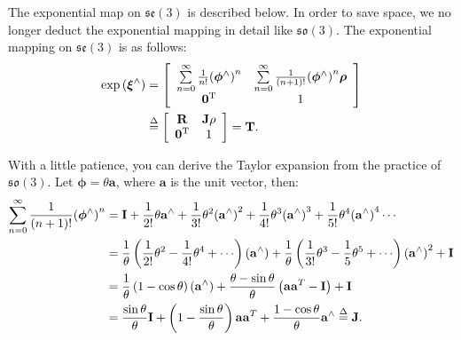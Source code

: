 The exponential map on $\mathfrak{se}(3)$ is described below. In order to save space, we no longer deduct the exponential mapping in detail like $\mathfrak{so}(3)$. The exponential mapping on $\mathfrak{se}(3)$ is as follows:
\begin{align}
\exp \left( {{ \boldsymbol{\xi} ^ \wedge }} \right) &= \left[ {\begin{array}{*{20}{c}}
    {\sum\limits_{n = 0}^\infty {\frac{1}{{n!}}{{\left( {{\boldsymbol{\phi} ^ \wedge }} \right)}^n} } }&{\sum\limits_{n = 0}^\infty {\frac{1}{{\left( {n + 1} \right)!}}{{\left( {{\boldsymbol{\phi } ^ \wedge }} \right)}^n} \boldsymbol{\rho} } }\\
    {{\mathbf{0}^\mathrm{T}}}&1
    \end{array}} \right] \\
&\buildrel \Delta \over = \left[ {\begin{array}{*{20}{c}}
    \mathbf{R} &{\mathbf{J\rho} } \\
    {{\mathbf{0}^\mathrm{T}}}&1
    \end{array}} \right] = \mathbf{T}.
\end{align}

With a little patience, you can derive the Taylor expansion from the practice of $\mathfrak{so}(3)$. Let $\boldsymbol{\phi}=\theta \mathbf{a}$, where $\mathbf{a}$ is the unit vector, then:
\begin{equation}
\begin{aligned}
\sum\limits_{n = 0}^\infty {\frac{1}{{\left( {n + 1} \right)!}}{{\left( {{\boldsymbol{\phi} ^ \wedge }} \right)}^n}} &= \mathbf{I} + \frac{1}{{2!}}\theta {\mathbf{a}^ \wedge } + \frac{1}{{3 !}}{\theta ^2}{\left( {{\mathbf{a}^ \wedge }} \right)^2} + \frac{1}{{4!}}{\theta ^3}{ \left( {{\mathbf{a}^ \wedge }} \right)^3} + \frac{1}{{5!}}{\theta ^4}{\left( {{\mathbf{a} ^ \wedge }} \right)^4} \cdots \\
&= \frac{1}{\theta }\left( {\frac{1}{{2!}}{\theta ^2} - \frac{1}{{4!}}{\theta ^4} + \cdots } \right)\left( {{\mathbf{a}^ \wedge }} \right) + \frac{1}{\theta }\left( {\frac{1}{{3!}} {\theta ^3} - \frac{1}{5}{\theta ^5} + \cdots } \right){\left( {{\mathbf{a}^ \wedge }} \right)^2} + \mathbf{I}\\
&= \frac{1}{\theta }\left( {1 - \cos \theta } \right)\left( {{\mathbf{a}^ \wedge }} \right) + \frac{{\theta - \sin \theta }}{\theta }\left( {\mathbf{a}{\mathbf{a}^T} - \mathbf{I}} \right) + \mathbf{I}\\
&= \frac{{\sin \theta }}{\theta }\mathbf{I} + \left( {1 - \frac{{\sin \theta }}{\theta }} \right)\mathbf{a }{\mathbf{a}^T} + \frac{{1 - \cos \theta }}{\theta }{\mathbf{a}^ \wedge } \buildrel \Delta \over = \mathbf{J}.
\end{aligned}
\end{equation}

